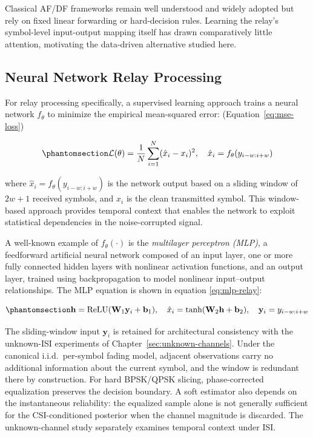 Classical AF/DF frameworks remain well understood and widely adopted \cite{Nosratinia2004CooperativeCommunication} but rely on fixed linear forwarding or hard-decision rules. Learning the relay's symbol-level input-output mapping itself has drawn comparatively little attention, motivating the data-driven alternative studied here.

\subsection{Neural Network Relay Processing}\label{sec:neural-network-relay-processing}

For relay processing specifically, a supervised learning approach trains a neural network \(f_\theta\) to minimize the empirical mean-squared error: (Equation~\ref{eq:mse-loss})

\begin{equation}\protect\phantomsection\label{eq:mse-loss}{\mathcal{L}(\theta) = \frac{1}{N} \sum_{i=1}^{N} (\hat{x}_i - x_i)^2, \quad \hat{x}_i = f_\theta(y_{i-w:i+w})
}\end{equation}

where \(\hat{x}_i = f_\theta(y_{i-w:i+w})\) is the network output based on a sliding window of \(2w+1\) received symbols, and \(x_i\) is the clean transmitted symbol. This window-based approach provides temporal context that enables the network to exploit statistical dependencies in the noise-corrupted signal.

A well-known example of \(f_\theta(\cdot)\) is the \emph{multilayer perceptron (MLP)}, a feedforward artificial neural network composed of an input layer, one or more fully connected hidden layers with nonlinear activation functions, and an output layer, trained using backpropagation to model nonlinear input--output relationships.
The MLP equation is shown in equation \ref{eq:mlp-relay}:

\begin{equation}\protect\phantomsection\label{eq:mlp-relay}{\mathbf{h} = \text{ReLU}(\mathbf{W}_1 \mathbf{y}_i + \mathbf{b}_1), \quad \hat{x}_i = \tanh(\mathbf{W}_2 \mathbf{h} + \mathbf{b}_2), \quad \mathbf{y}_i = y_{i-w:i+w}
}\end{equation}

The sliding-window input $\mathbf{y}_i$ is retained for architectural consistency with the unknown-ISI experiments of Chapter~\ref{sec:unknown-channels}. Under the canonical i.i.d.\ per-symbol fading model, adjacent observations carry no additional information about the current symbol, and the window is redundant there by construction. For hard BPSK/QPSK slicing, phase-corrected equalization preserves the decision boundary. A soft estimator also depends on the instantaneous reliability: the equalized sample alone is not generally sufficient for the CSI-conditioned posterior when the channel magnitude is discarded. The unknown-channel study separately examines temporal context under ISI.

